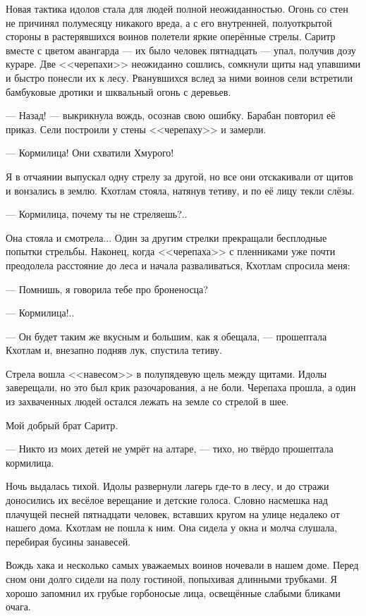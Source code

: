 Новая тактика идолов стала для людей полной неожиданностью.
Огонь со стен не причинял полумесяцу никакого вреда, а с его внутренней, полуоткрытой стороны в растерявшихся воинов полетели яркие оперённые стрелы.
Саритр вместе с цветом авангарда --- их было человек пятнадцать --- упал, получив дозу кураре.
Две <<черепахи>> неожиданно сошлись, сомкнули щиты над упавшими и быстро понесли их к лесу.
Рванувшихся вслед за ними воинов сели встретили бамбуковые дротики и шквальный огонь с деревьев.

--- Назад! --- выкрикнула вождь, осознав свою ошибку.
Барабан повторил её приказ.
Сели построили у стены <<черепаху>> и замерли.

--- Кормилица!
Они схватили Хмурого!

Я в отчаянии выпускал одну стрелу за другой, но все они отскакивали от щитов и вонзались в землю.
Кхотлам стояла, натянув тетиву, и по её лицу текли слёзы.

--- Кормилица, почему ты не стреляешь?..

Она стояла и смотрела...
Один за другим стрелки прекращали бесплодные попытки стрельбы.
Наконец, когда <<черепаха>> с пленниками уже почти преодолела расстояние до леса и начала разваливаться, Кхотлам спросила меня:

--- Помнишь, я говорила тебе про броненосца?

--- Кормилица!..

--- Он будет таким же вкусным и большим, как я обещала, --- прошептала Кхотлам и,
внезапно подняв лук, спустила тетиву.

Стрела вошла <<навесом>> в полупядевую щель между щитами.
Идолы заверещали, но это был крик разочарования, а не боли.
Черепаха прошла, а один из захваченных людей остался лежать на земле со стрелой в шее.

Мой добрый брат Саритр.

--- Никто из моих детей не умрёт на алтаре, --- тихо, но твёрдо прошептала кормилица.

\asterism

Ночь выдалась тихой.
Идолы развернули лагерь где-то в лесу, и до стражи доносились их весёлое верещание и детские голоса.
Словно насмешка над плачущей песней пятнадцати человек, вставших кругом на улице недалеко от нашего дома.
Кхотлам не пошла к ним.
Она сидела у окна и молча слушала, перебирая бусины занавесей.

Вождь хака и несколько самых уважаемых воинов ночевали в нашем доме.
Перед сном они долго сидели на полу гостиной, попыхивая длинными трубками.
Я хорошо запомнил их грубые горбоносые лица, освещённые слабыми бликами очага.


